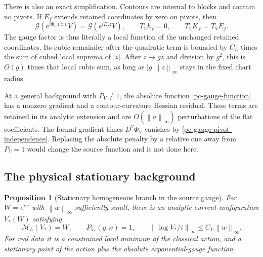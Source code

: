 \documentclass[11pt]{article}
\newtheorem{proposition}[theorem]{Proposition}
\theoremstyle{remark}
\newcommand{\norm}[1]{\left\|#1\right\|}
\begin{document}
There is also an exact simplification. Contours are internal to
blocks and contain no pivots. If $E_f$ extends retained
coordinates by zero on pivots, then
\begin{equation}\label{pc-gauge-pivot-independence}
 \mathcal G(e^{i\Phi_V(z)}V)=\mathcal G(e^{iE_fz}V),\qquad
 T_Vh_V=0,\qquad T_VK_V=T_VE_f.
\end{equation}
The gauge factor is thus literally a local function of the
unchanged retained coordinates. Its cubic remainder after the
quadratic term is bounded by $C_L$ times the sum of cubed local
suprema of $|z|$. After $z\mapsto gz$ and division by $g^2$,
this is $O(g)$ times that local cubic sum, as long as
$|g|\norm z_\infty$ stays in the fixed chart radius.

At a general background with $P_V\ne1$, the absolute function
\eqref{pc-gauge-function} has a nonzero gradient and a
contour-curvature Hessian residual. These terms are retained in
its analytic extension and are $O(\norm a_\infty)$ perturbations
of the flat coefficients. The formal gradient times
$D^2\Phi_V$ vanishes by
\eqref{pc-gauge-pivot-independence}. Replacing the absolute
penalty by a relative one away from $P_V=1$ would change the
source function and is not done here.

\subsection{The physical stationary background}
\label{pc-stationary-section}

\begin{proposition}[Stationary homogeneous branch in the source gauge]
\label{pc-stationary}
For $W=e^{iw}$ with $\norm w_\infty$ sufficiently small, there
is an analytic current configuration $V_*(W)$ satisfying
\begin{equation}\label{pc-stationary-identities}
 \mathcal M_L(V_*)=W,\qquad P_{V_*}(y,x)=1,\qquad
 \norm{\log V_*/i}_\infty\le C_L\norm w_\infty.
\end{equation}
For real data it is a constrained local minimum of the
classical action, and a stationary point of the action plus
the absolute exponential-gauge function.
\end{proposition}
\end{document}
